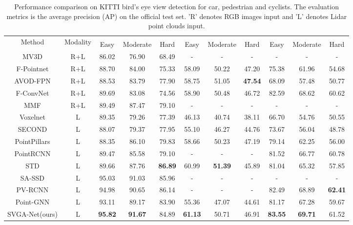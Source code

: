 \documentclass{article}
\begin{document}
\begin{wraptable}{r}{9.5cm}
\setlength{\abovecaptionskip}{-35pt}
\setlength{\belowcaptionskip}{-5pt}
	\scriptsize
\caption{Performance comparison on KITTI bird's eye view detection for car, pedestrian and cyclists. The evaluation metrics is the average precision (AP) on the official test set. 'R' denotes RGB images input and 'L' denotes Lidar point clouds input.}
\label{tab:two}
\begin{center}
\setlength{\tabcolsep}{0.4mm}
\begin{tabular}{ccccccccccc} \toprule
            \multirow{2}{*}{Method} & \multirow{2}{*}{Modality}  & \multicolumn{3}{c}{} & \multicolumn{3}{c}{} & \multicolumn{3}{c}{} \\
            \cmidrule(r){3-5} \cmidrule(r){6-8} \cmidrule(r){9-11}
                  &    & Easy & Moderate & Hard & Easy & Moderate & Hard & Easy & Moderate & Hard\\ \hline
MV3D\cite{chen2017multi} & R+L & 86.02 & 76.90  & 68.49 & -  & - & -  & - & - & -\\
F-Pointnet\cite{qi2018frustum} & R+L & 88.70 & 84.00  & 75.33 & 58.09  & 50.22 & 47.20  & 75.38 & 61.96 & 54.68\\
AVOD-FPN\cite{ku2018joint} & R+L & 88.53 & 83.79  & 77.90 & 58.75  & 51.05 & {\bf47.54}  & 68.09 & 57.48 & 50.77\\
F-ConvNet\cite{wang2019frustum} & R+L & 89.69 & 83.08 & 74.56 & 58.90 & 50.48 & 46.72 & 82.59 & 68.62 & 60.62\\
MMF\cite{liang2019multi} & R+L & 89.49 & 87.47  & 79.10 & -  & - & -  & - & - & -\\\hline
Voxelnet\cite{zhou2018voxelnet} &   L    & 89.35 & 79.26  & 77.39 & 46.13  & 40.74 & 38.11  & 66.70 & 54.76 & 50.55\\
SECOND\cite{yan2018second} &   L   & 88.07 & 79.37  & 77.95 & 55.10  & 46.27 & 44.76  & 73.67 & 56.04 & 48.78\\
PointPillars\cite{lang2019pointpillars} &   L   & 88.35 & 86.10  & 79.83 & 58.66  & 50.23 & 47.19  & 79.14 & 62.25 & 56.00\\
PointRCNN\cite{shi2019pointrcnn} &   L   & 89.47 & 85.58  & 79.10 & -  & - & -  & 81.52 & 66.77 & 60.78\\
STD\cite{yang2019std} &   L   & 89.66 & 87.76  & {\bf86.89} & 60.99  & {\bf51.39} & 45.89  & 81.04 & 65.32 & 57.85\\
SA-SSD\cite{hestructure} & L & 95.03 & 91.03 & 85.96   & - & - & - & - & - & - \\
PV-RCNN \cite{shi2019pv} &  L   &   94.98  & 90.65 & 86.14  & - & - & - &  82.49  & 68.89  & {\bf62.41}   \\
Point-GNN\cite{Point-GNN} & L & 93.11 & 89.17 & 83.90 & 55.36 & 47.07 & 44.61 & 81.17 & 67.28 & 59.67\\\hline
SVGA-Net(ours) & L & {\bf95.82} & {\bf91.67}  & 84.89 & {\bf61.13}  & 50.71 & 46.91  & {\bf83.55} & {\bf69.71} & 61.52\\
            \bottomrule
        \end{tabular}
\end{center}
\end{wraptable}
\end{document}
